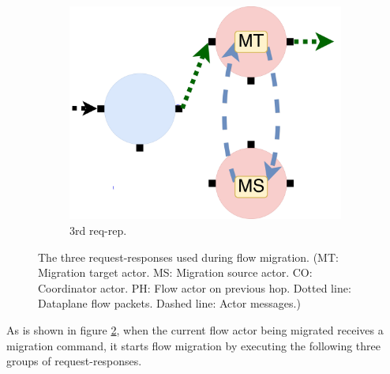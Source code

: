\begin{figure}[!h]
\begin{subfigure}[t]{0.33\linewidth}
 \centering
   \includegraphics[width=\columnwidth]{figure/nfactor-mig3.pdf}
   \caption{3rd req-rep.}\label{fig:mig3} \end{subfigure}\hfill
 \caption{The three request-responses used during flow migration. (MT: Migration target actor. MS: Migration source actor. CO: Coordinator actor. PH: Flow actor on previous hop. Dotted line: Dataplane flow packets. Dashed line: Actor messages.)}
\label{fig:mig}
\end{figure}

As is shown in figure \ref{fig:mig}, when the current flow actor being migrated receives a migration command, it starts flow migration by executing the following three groups of request-responses.

